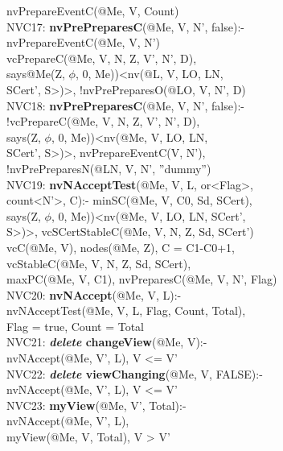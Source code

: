 \begin{code}
\> nvPrepareEventC(@Me, V, Count) \\
NVC17: \textbf{nvPrePreparesC}(@Me, V, N', false):-\\
\> nvPrepareEventC(@Me, V, N')\\
\> vcPrepareC(@Me, V, N, Z, V', N', D),\\
\> says@Me(Z, $\phi$, 0, Me))<nv(@L, V, LO, LN, \\
\> SCert', S>)>, !nvPrePreparesO(@LO, V, N', D)\\
NVC18: \textbf{nvPrePreparesC}(@Me, V, N', false):-\\
\> !vcPrepareC(@Me, V, N, Z, V', N', D),\\
\> says(Z, $\phi$, 0, Me))<nv(@Me, V, LO, LN, \\
\> SCert', S>)>, nvPrepareEventC(V, N'), \\
\> !nvPrePreparesN(@LN, V, N', ''dummy'')\\
NVC19: \textbf{nvNAcceptTest}(@Me, V, L, or<Flag>, \\
\> count<N'>, C):- minSC(@Me, V, C0, Sd, SCert), \\
\> says(Z, $\phi$, 0, Me))<nv(@Me, V, LO, LN, SCert', \\
\> S>)>, vcSCertStableC(@Me, V, N, Z, Sd, SCert')\\
\> vcC(@Me, V), nodes(@Me, Z), C = C1-C0+1, \\
\> vcStableC(@Me, V, N, Z, Sd, SCert), \\
\> maxPC(@Me, V, C1), nvPreparesC(@Me, V, N', Flag)\\
NVC20: \textbf{nvNAccept}(@Me, V, L):- \\
\> nvNAcceptTest(@Me, V, L, Flag, Count, Total), \\
\> Flag = true, Count = Total\\
NVC21: \textbf{\textit{delete} changeView}(@Me, V):-\\
\> nvNAccept(@Me, V', L), V <= V'\\
NVC22: \textbf{\textit{delete} viewChanging}(@Me, V, FALSE):-\\
\> nvNAccept(@Me, V', L), V <= V'\\
NVC23: \textbf{myView}(@Me, V', Total):-\\
\> nvNAccept(@Me, V', L),\\
\> myView(@Me, V, Total), V > V'\\
\end{code}
